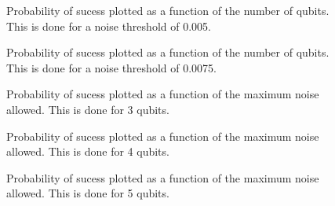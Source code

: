 \pagebreak

\begin{figure}
\begin{center}
\end{center}
\caption{Probability of sucess plotted as a function of the number of qubits. This
is done for a noise threshold of 0.005.}
\end{figure}

\pagebreak

\begin{figure}
\begin{center}
\end{center}
\caption{Probability of sucess plotted as a function of the number of qubits. This
is done for a noise threshold of 0.0075.}
\end{figure}

\pagebreak

\begin{figure}
\begin{center}
\end{center}
\caption{Probability of sucess plotted as a function of the maximum noise allowed.
This is done for 3 qubits.}
\end{figure}

\pagebreak

\begin{figure}
\begin{center}
\end{center}
\caption{Probability of sucess plotted as a function of the maximum noise allowed.
This is done for 4 qubits.}
\end{figure}

\pagebreak

\begin{figure}
\begin{center}
\end{center}
\caption{Probability of sucess plotted as a function of the maximum noise allowed.
This is done for 5 qubits.}
\end{figure}

%
%
%
